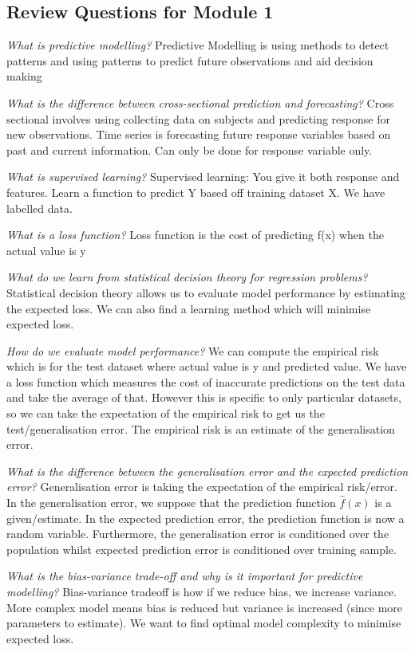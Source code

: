 \documentclass[11pt, oneside]{article}
\theoremstyle{definition}
\begin{document}
\subsection{Review Questions for Module 1}
\textit{What is predictive modelling?}
Predictive Modelling is using methods to detect patterns and using patterns to predict future observations and aid decision making

\textit{What is the difference between cross-sectional prediction and forecasting?}
Cross sectional involves using collecting data on subjects and predicting response for new observations. Time series is forecasting future response variables based on past and current information. Can only be done for response variable only.

\textit{What is supervised learning?}
Supervised learning: You give it both response and features. Learn a function to predict Y based off training dataset X. We have labelled data.

\textit{What is a loss function?}
Loss function is the cost of predicting f(x) when the actual value is y

\textit{What do we learn from statistical decision theory for regression problems?}
Statistical decision theory allows us to evaluate model performance by estimating the expected loss. We can also find a learning method which will minimise expected loss.

\textit{How do we evaluate model performance?}
We can compute the empirical risk which is for the test dataset where actual value is y and predicted value. We have a loss function which measures the cost of inaccurate predictions on the test data and take the average of that. However this is specific to only particular datasets, so we can take the expectation of the empirical risk to get us the test/generalisation error. The empirical risk is an estimate of the generalisation error.

\textit{What is the difference between the generalisation error and the expected prediction error?}
Generalisation error is taking the expectation of the empirical risk/error. In the generalisation error, we suppose that the prediction function $\hat{f}(x)$ is a given/estimate. In the expected prediction error, the prediction function is now a random variable. Furthermore, the generalisation error is conditioned over the population whilst expected prediction error is conditioned over training sample.

\textit{What is the bias-variance trade-off  and why is it important for predictive modelling?}
Bias-variance tradeoff is how if we reduce bias, we increase variance. More complex model means bias is reduced but variance is increased (since more parameters to estimate). We want to find optimal model complexity to minimise expected loss.
\end{document}
